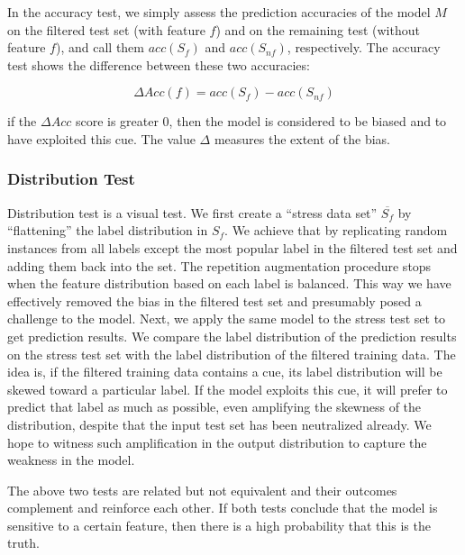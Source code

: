In the accuracy test, we simply assess the prediction accuracies of the model
$M$ on the filtered test set (with feature $f$) and on the remaining test (without feature $f$), 
and call them $acc(S_f)$ and $acc(S_{nf})$, respectively. 
The accuracy test shows the difference
between these two accuracies: 

\begin{equation}
\Delta Acc(f)=acc(S_f) - acc(S_{nf})
\end{equation} 

if the $\Delta Acc$ score is greater 0, then the
model is considered to be biased and to have exploited this cue. 
The value $\Delta$ measures the extent of the bias.


\subsubsection{Distribution Test}
\label{sec:distributiontest}
Distribution test is a visual test. We first create a ``stress data set'' $\overline{S_f}$
by ``flattening'' the label distribution in $S_f$.  
We achieve that by replicating random instances from all labels 
except the most popular label in the filtered test
set and adding them back into the set. 
The repetition augmentation procedure stops when 
the feature distribution based on each label is balanced.
This way we have effectively removed the bias 
in the filtered test set and presumably 
posed a challenge to the model. 
Next, we apply the same model to the stress test set 
to get prediction results. 
We compare the label distribution of the prediction results on 
the stress test set with the label distribution of 
the filtered training data.
The idea is, if the filtered training data contains a cue, 
its label distribution will be skewed toward a particular label.
If the model exploits this cue, it will prefer to predict
that label as much as possible, even amplifying the skewness
of the distribution, despite that the input test set has been
neutralized already. We hope to witness such amplification
in the output distribution to capture
the weakness in the model.

The above two tests are related but not equivalent
and their outcomes complement and reinforce each other. 
If both tests conclude that the model is sensitive to a certain feature, 
then there is a high probability that this is the truth.

